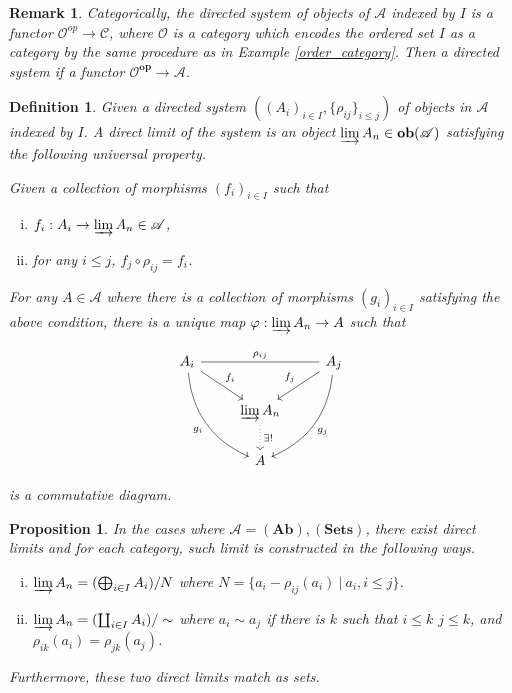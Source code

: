 \documentclass{article}
\newtheorem{proposition}{Proposition}[section]
\newtheorem{definition}{Definition}[section]
\newtheorem{remark}{Remark}[section]
\numberwithin{equation}{section}
\begin{document}
\begin{remark}
Categorically, the directed system of objects of $\mathcal{A}$ indexed by $I$ is a functor $\mathcal{O}^{op}\to\mathcal{C}$, where $\mathcal{O}$ is a category which encodes the ordered set $I$ as a category by the same procedure as in Example \ref{order_category}. Then a directed system if a functor $\mathcal{O}^{\mathbf{op}}\to\mathcal{A}$.
\end{remark}

\begin{definition}
Given a directed system $((A_i)_{i\in I},\{\rho_{ij}\}_{i\leq j})$ of objects in $\mathcal{A}$ indexed by $I$. A direct limit of the system is an object $\varinjlim{A_n}\in\mathbf{ob}(\mathcal{A})$ satisfying the following universal property.\\
\par Given a collection of morphisms $(f_i)_{i\in I}$ such that 
\begin{enumerate}[i).]
\item $f_i:A_i\to\varinjlim A_n\in\mathcal{A}$,
\item for any $i\leq j$, $f_j\circ\rho_{ij} = f_i$.
\end{enumerate}
For any $A\in\mathcal{A}$ where there is a collection of morphisms $(g_i)_{i\in I}$ satisfying the above condition, there is a unique map $\varphi:\varinjlim A_n\to A$ such that

\[ 
\begin{tikzcd}
A_i \arrow[rr, "\rho_{ij}", no head] \arrow[rd, "f_i"] \arrow[rdd, swap, "g_i", bend right] &                                               & A_j \arrow[ld, "f_j"'] \arrow[ldd, "g_j", bend left] \\
                                                                                      & \varinjlim A_n \arrow[d, "\exists !", dotted] &                                                      \\
                                                                                      & A                                             &                                                     
\end{tikzcd}
\]

is a commutative diagram.
\end{definition}

\begin{proposition}
In the cases where $\mathcal{A}=(\mathbf{Ab}),(\mathbf{Sets})$, there exist direct limits and for each category, such limit is constructed in the following ways.
\begin{enumerate}[i).]
\item $\varinjlim A_n = (\bigoplus_{i\in I}A_i)/N$ where $N=\{a_i-\rho_{ij}(a_i)\:|\:a_i,i\leq j\}$.
\item $\varinjlim A_n = (\coprod_{i\in I}A_i)/\sim$ where $a_i\sim a_j$ if there is $k$ such that $i\leq k$ $j\leq k$, and $\rho_{ik}(a_i)=\rho_{jk}(a_j)$.
\end{enumerate}
Furthermore, these two direct limits match as sets.
\end{proposition}
\end{document}
